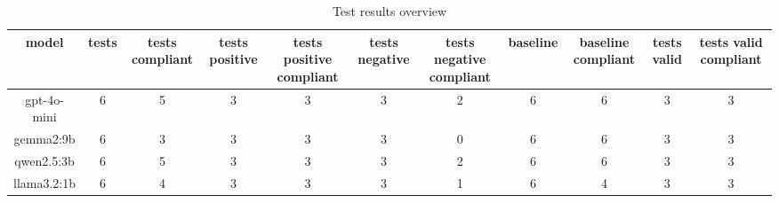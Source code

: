 
  \begin{table}[h!]
  \centering
  \begin{tabular}{|c|c|c|c|c|c|c|c|c|c|c|}
  \hline
  model & tests & tests compliant & tests positive & tests positive compliant & tests negative & tests negative compliant & baseline & baseline compliant & tests valid & tests valid compliant \\
  \hline
  gpt-4o-mini & 6 & 5 & 3 & 3 & 3 & 2 & 6 & 6 & 3 & 3\\
\hline
gemma2:9b & 6 & 3 & 3 & 3 & 3 & 0 & 6 & 6 & 3 & 3\\
\hline
qwen2.5:3b & 6 & 5 & 3 & 3 & 3 & 2 & 6 & 6 & 3 & 3\\
\hline
llama3.2:1b & 6 & 4 & 3 & 3 & 3 & 1 & 6 & 4 & 3 & 3
  \end{tabular}
  \caption{Test results overview}
  
  \end{table}
  